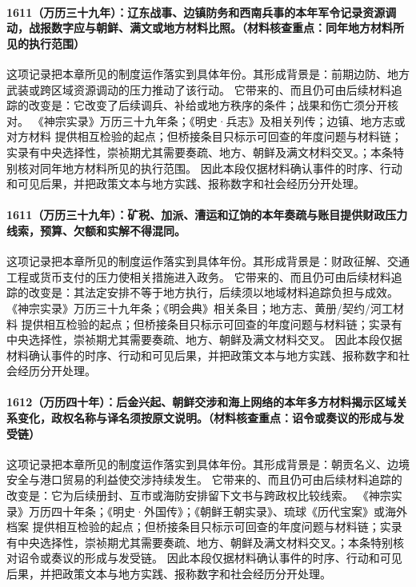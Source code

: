 \paragraph{1611（万历三十九年）：辽东战事、边镇防务和西南兵事的本年军令记录资源调动，战报数字应与朝鲜、满文或地方材料比照。（材料核查重点：同年地方材料所见的执行范围）} 这项记录把本章所见的制度运作落实到具体年份。其形成背景是：前期边防、地方武装或跨区域资源调动的压力推动了该行动。 它带来的、而且仍可由后续材料追踪的改变是：它改变了后续调兵、补给或地方秩序的条件；战果和伤亡须分开核对。 《神宗实录》万历三十九年条；《明史·兵志》及相关列传；边镇、地方志或对方材料 提供相互检验的起点；但桥接条目只标示可回查的年度问题与材料链；实录有中央选择性，崇祯期尤其需要奏疏、地方、朝鲜及满文材料交叉。；本条特别核对同年地方材料所见的执行范围。 因此本段仅据材料确认事件的时序、行动和可见后果，并把政策文本与地方实践、报称数字和社会经历分开处理。

\paragraph{1611（万历三十九年）：矿税、加派、漕运和辽饷的本年奏疏与账目提供财政压力线索，预算、欠额和实解不得混同。} 这项记录把本章所见的制度运作落实到具体年份。其形成背景是：财政征解、交通工程或货币支付的压力使相关措施进入政务。 它带来的、而且仍可由后续材料追踪的改变是：其法定安排不等于地方执行，后续须以地域材料追踪负担与成效。 《神宗实录》万历三十九年条；《明会典》相关条目；地方志、黄册/契约/河工材料 提供相互检验的起点；但桥接条目只标示可回查的年度问题与材料链；实录有中央选择性，崇祯期尤其需要奏疏、地方、朝鲜及满文材料交叉。 因此本段仅据材料确认事件的时序、行动和可见后果，并把政策文本与地方实践、报称数字和社会经历分开处理。

\paragraph{1612（万历四十年）：后金兴起、朝鲜交涉和海上网络的本年多方材料揭示区域关系变化，政权名称与译名须按原文说明。（材料核查重点：诏令或奏议的形成与发受链）} 这项记录把本章所见的制度运作落实到具体年份。其形成背景是：朝贡名义、边境安全与港口贸易的利益使交涉持续发生。 它带来的、而且仍可由后续材料追踪的改变是：它为后续册封、互市或海防安排留下文书与跨政权比较线索。 《神宗实录》万历四十年条；《明史·外国传》；《朝鲜王朝实录》、琉球《历代宝案》或海外档案 提供相互检验的起点；但桥接条目只标示可回查的年度问题与材料链；实录有中央选择性，崇祯期尤其需要奏疏、地方、朝鲜及满文材料交叉。；本条特别核对诏令或奏议的形成与发受链。 因此本段仅据材料确认事件的时序、行动和可见后果，并把政策文本与地方实践、报称数字和社会经历分开处理。

